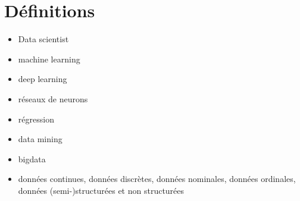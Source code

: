 \def\xxactivite{Cours}
\def\xxauteur{\textsl{Xavier Pessoles}}

\fichefalse
\proftrue
\tdfalse
\courstrue

\def\xxnumchapitre{Chapitre 1 \vspace{.2cm}}
\def\xxchapitre{\hspace{.12cm} Introduction}

\def\xxcompetences{%
\textsl{%
\textbf{Savoirs et compétences :}\\
\begin{itemize}[label=\ding{112},font=\color{ocre}] 
\item A voir
\end{itemize}
}}



\def\xxfigures{
}%

\iflivret

\else

\fi
\setlength{\columnseprule}{.1pt}

\vspace{2cm}
\pagestyle{fancy}
\thispagestyle{plain}


\section{Définitions}

\begin{itemize}
\item Data scientist
\item machine learning
\item deep learning
\item réseaux de neurons
\item régression
\item data mining
\item bigdata
\item données continues, données discrètes, données nominales, données ordinales, données (semi-)structurées et non structurées

\end{itemize}


